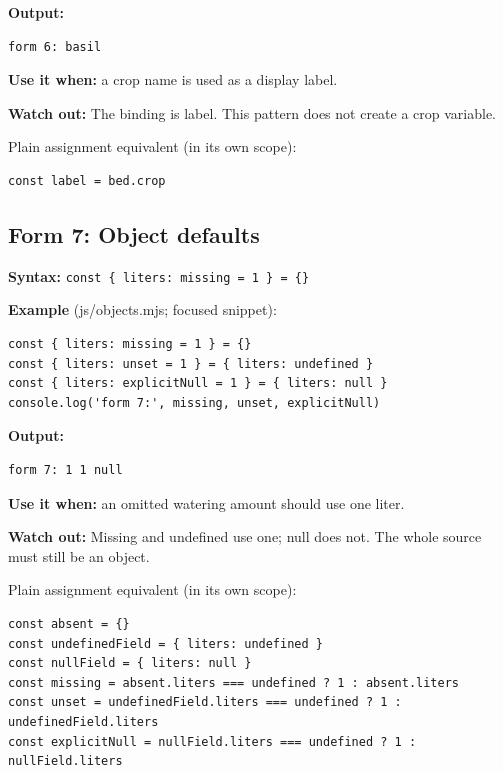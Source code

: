 \documentclass[
  10pt,
  a4paper,
]{article}
\begin{document}
\textbf{Output:}

\begin{lstlisting}
form 6: basil
\end{lstlisting}

\textbf{Use it when:} a crop name is used as a display label.

\textbf{Watch out:} The binding is label. This pattern does not create a
crop variable.

Plain assignment equivalent (in its own scope):

\begin{lstlisting}
const label = bed.crop
\end{lstlisting}

\subsection{Form 7: Object defaults}\label{form-7-object-defaults}

\textbf{Syntax:}
\texttt{const \{ liters:\allowbreak{} missing =\allowbreak{} 1 \} =\allowbreak{} \{\}}

\textbf{Example} (js/objects.mjs; focused snippet):

\begin{lstlisting}
const { liters: missing = 1 } = {}
const { liters: unset = 1 } = { liters: undefined }
const { liters: explicitNull = 1 } = { liters: null }
console.log('form 7:', missing, unset, explicitNull)
\end{lstlisting}

\textbf{Output:}

\begin{lstlisting}
form 7: 1 1 null
\end{lstlisting}

\textbf{Use it when:} an omitted watering amount should use one liter.

\textbf{Watch out:} Missing and undefined use one; null does not. The
whole source must still be an object.

Plain assignment equivalent (in its own scope):

\begin{lstlisting}
const absent = {}
const undefinedField = { liters: undefined }
const nullField = { liters: null }
const missing = absent.liters === undefined ? 1 : absent.liters
const unset = undefinedField.liters === undefined ? 1 : undefinedField.liters
const explicitNull = nullField.liters === undefined ? 1 : nullField.liters
\end{lstlisting}
\end{document}
